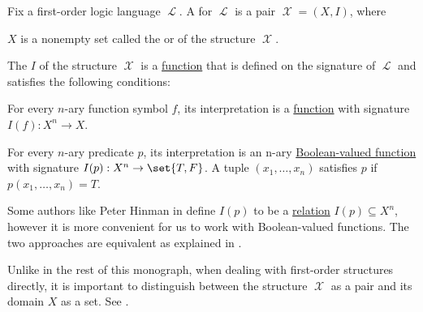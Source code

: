 \begin{definition}\label{def:first_order_structure}
  Fix a first-order logic language \( \mscrL \). A  for \( \mscrL \) is a pair \( \mscrX = (X, I) \), where
  \begin{thmenum}
     \( X \) is a nonempty set called the  or  of the structure \( \mscrX \).

     The  \( I \) of the structure \( \mscrX \) is a \hyperref[def:function]{function} that is defined on the signature of \( \mscrL \) and satisfies the following conditions:
    \begin{thmenum}
       For every \( n \)-ary function symbol \( f \), its interpretation is a \hyperref[def:function]{function} with signature \( I(f): X^n \to X \).

       For every \( n \)-ary predicate \( p \), its interpretation is an n-ary \hyperref[def:boolean_function]{Boolean-valued function} with signature \( I(p): X^n \to \set{ T, F } \). A tuple \( (x_1, \ldots, x_n) \) satisfies \( p \) if \( p(x_1, \ldots, x_n) = T \).
    \end{thmenum}
  \end{thmenum}
\end{definition}
\begin{comments}
  \item Some authors like Peter Hinman in  define \( I(p) \) to be a \hyperref[def:relation]{relation} \( I(p) \subseteq X^n \), however it is more convenient for us to work with Boolean-valued functions. The two approaches are equivalent as explained in .
  \item Unlike in the rest of this monograph, when dealing with first-order structures directly, it is important to distinguish between the structure \( \mscrX \) as a pair and its domain \( X \) as a set. See .
\end{comments}

